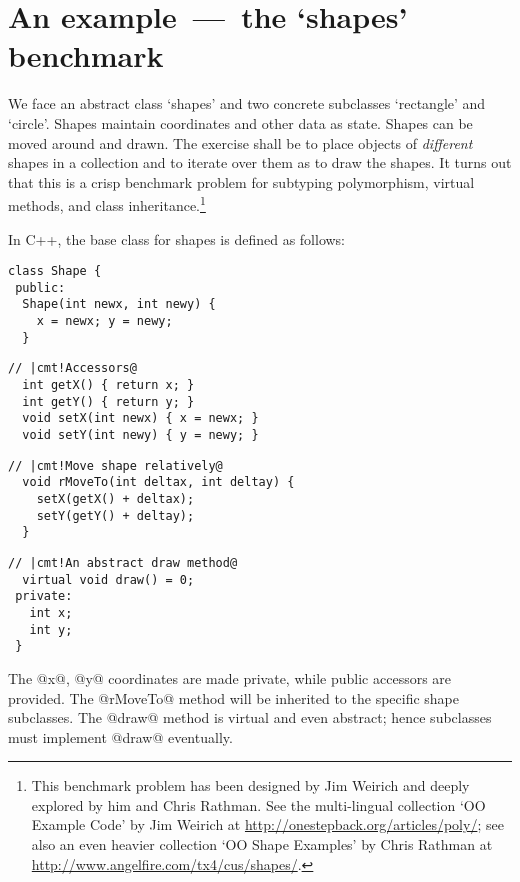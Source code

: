 \medskip

\section{An example~---~the `shapes' benchmark}
\label{S:shapes}

We face an abstract class `shapes' and two concrete subclasses
`rectangle' and `circle'. Shapes maintain coordinates and other data
as state. Shapes can be moved around and drawn. The exercise shall be
to place objects of \emph{different} shapes in a collection and to
iterate over them as to draw the shapes. It turns out that this is a
crisp benchmark problem for subtyping polymorphism, virtual methods,
and class inheritance.\footnote{\small This benchmark problem has been
designed by Jim Weirich and deeply explored by him and Chris
Rathman. See the multi-lingual collection `OO Example Code' by Jim
Weirich at \url{http://onestepback.org/articles/poly/}; see also an
even heavier collection `OO Shape Examples' by Chris Rathman at
\url{http://www.angelfire.com/tx4/cus/shapes/}.}

\smallskip

In C++, the base class for shapes is defined as follows:

\begin{Verbatim}[fontsize=\small,commandchars=\|\!\@]
 class Shape {
 public:
  Shape(int newx, int newy) {
    x = newx; y = newy;
  }
\end{Verbatim}

\begin{Verbatim}[fontsize=\small,commandchars=\|\!\@]
  // |cmt!Accessors@
  int getX() { return x; }
  int getY() { return y; }
  void setX(int newx) { x = newx; }
  void setY(int newy) { y = newy; }
\end{Verbatim}

\begin{Verbatim}[fontsize=\small,commandchars=\|\!\@]
  // |cmt!Move shape relatively@
  void rMoveTo(int deltax, int deltay) {
    setX(getX() + deltax);
    setY(getY() + deltay);
  }
\end{Verbatim}

\begin{Verbatim}[fontsize=\small,commandchars=\|\!\@]
  // |cmt!An abstract draw method@
  virtual void draw() = 0;
 private:
   int x;
   int y;
 }
\end{Verbatim}

The @x@, @y@ coordinates are made private, while public accessors are
provided. The @rMoveTo@ method will be inherited to the specific shape
subclasses. The @draw@ method is virtual and even abstract; hence
subclasses must implement @draw@ eventually.

